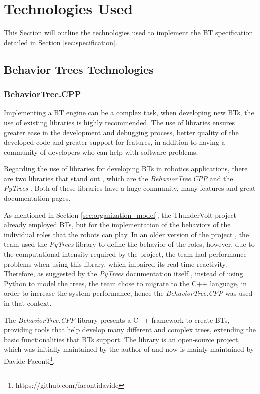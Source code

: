 \section{Technologies Used}
\label{sec:technologies_used}

This Section will outline the technologies used to implement the BT specification detailed in Section \ref{sec:specification}.

\subsection{Behavior Trees Technologies}

\subsubsection{BehaviorTree.CPP}

Implementing a BT engine can be a complex task, when developing new BTs, the use of existing libraries is highly recommended. The use of libraries ensures greater ease in the development and debugging process, better quality of the developed code and greater support for features, in addition to having a community of developers who can help with software problems.

Regarding the use of libraries for developing BTs in robotics applications, there are two libraries that stand out \cite{BTsAndFSMApplications}, which are the \textit{BehaviorTree.CPP} \cite{BehaviorTree.CPP} and the \textit{PyTrees} \cite{PyTrees}. Both of these libraries have a huge community, many features and great documentation pages.

As mentioned in Section \ref{sec:organization_model}, the ThunderVolt project already employed BTs, but for the implementation of the behaviors of the individual roles that the robots can play. In an older version of the project \cite{fira_thundervolt}, the team used the \textit{PyTrees} library to define the behavior of the roles, however, due to the computational intensity required by the project, the team had performance problems when using this library, which impaired its real-time reactivity. Therefore, as suggested by the \textit{PyTrees} documentation itself \cite{PyTreesDesign}, instead of using Python to model the trees, the team chose to migrate to the C++ language, in order to increase the system performance, hence the \textit{BehaviorTree.CPP} was used in that context.

The \textit{BehaviorTree.CPP} library presents a C++ framework to create BTs, providing tools that help develop many different and complex trees, extending the basic functionalities that BTs support. The library is an open-source project, which was initially maintained by the author of \cite{BTsInRobotics} and now is mainly maintained by Davide Faconti\footnote{https://github.com/facontidavide}.

